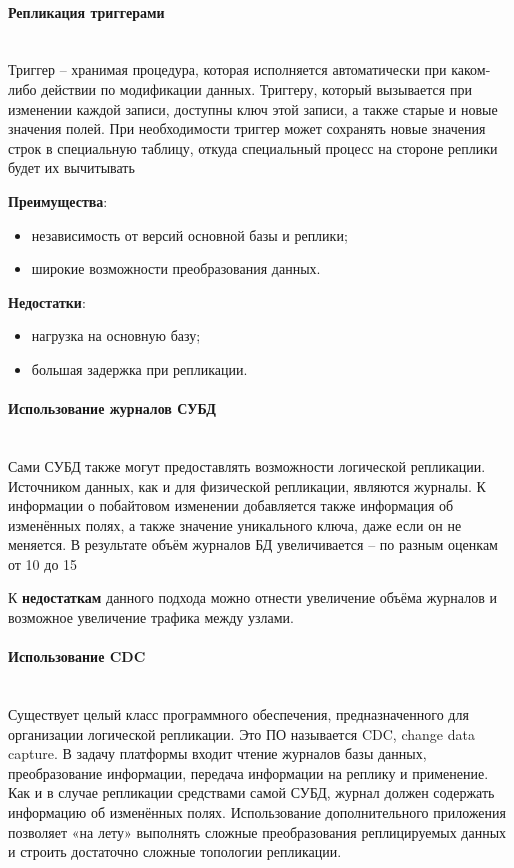 \paragraph{Репликация триггерами} ~\\
Триггер – хранимая процедура, которая исполняется автоматически при каком-либо действии по модификации данных. Триггеру,
который вызывается при изменении каждой записи, доступны ключ этой записи, а также старые и новые значения полей. При
необходимости триггер может сохранять новые значения строк в специальную таблицу, откуда специальный процесс на стороне
реплики будет их вычитывать

\textbf{Преимущества}:
\begin{itemize}
    \item независимость от версий основной базы и реплики;
    \item широкие возможности преобразования данных.
\end{itemize}

\textbf{Недостатки}:
\begin{itemize}
    \item нагрузка на основную базу;
    \item большая задержка при репликации.
\end{itemize}

\paragraph{Использование журналов СУБД} ~\\
Сами СУБД также могут предоставлять возможности логической репликации. Источником данных, как и для физической
репликации, являются журналы. К информации о побайтовом изменении добавляется также информация об изменённых полях, а
также значение уникального ключа, даже если он не меняется. В результате объём журналов БД увеличивается – по разным
оценкам от 10 до 15%

К \textbf{недостаткам} данного подхода можно отнести увеличение объёма журналов и возможное увеличение трафика между
узлами.

\paragraph{Использование CDC} ~\\
Существует целый класс программного обеспечения, предназначенного для организации логической репликации. Это ПО
называется CDC, change data capture. В задачу платформы входит чтение журналов базы данных, преобразование информации,
передача информации на реплику и применение. Как и в случае репликации средствами самой СУБД, журнал должен содержать
информацию об изменённых полях. Использование дополнительного приложения позволяет «на лету» выполнять сложные
преобразования реплицируемых данных и строить достаточно сложные топологии репликации.

